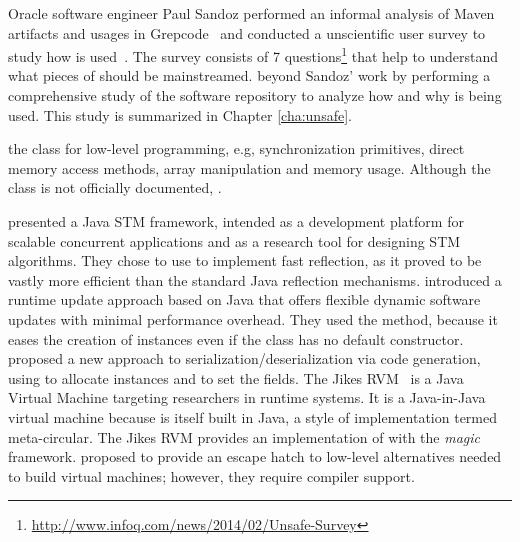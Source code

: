 Oracle software engineer Paul Sandoz performed an informal analysis of
Maven artifacts and usages in Grepcode~\citep{sandoz-personal-communication}
and conducted a unscientific user survey to study how \unsafe{} is used~\citep{psandoz14}.
The survey consists of 7 questions\footnote{\url{http://www.infoq.com/news/2014/02/Unsafe-Survey}} 
that help to understand what pieces of \smu{} should be mainstreamed.
beyond Sandoz' work
by performing a comprehensive study of the \mavencentral{} software repository to analyze how and why \smu{} is being used.
This study is summarized in Chapter \ref{cha:unsafe}.

 the \smu{} class for low-level programming, e.g, synchronization primitives, direct memory access methods, array manipulation and memory usage.
Although the \smu{} class is not officially documented,
.

\cite{korlandNoninvasiveConcurrencyJava2010} presented a Java STM framework, intended as a development platform for scalable concurrent applications and as a research tool for designing STM algorithms.
They chose to use \smu{} to implement fast reflection, as it proved to be vastly more efficient than the standard Java reflection mechanisms.
\cite{pukallFlexibleDynamicSoftware} introduced a runtime update approach based on Java that offers flexible dynamic software updates with minimal performance overhead.
They used the  method, because it eases the creation of instances even if the class has no default constructor.
\cite{gligoricCoDeSeFastDeserialization2011} proposed a new approach to serialization/deserialization via code generation, using \smu{} to allocate instances and to set the fields.
The Jikes RVM~\cite{alpernJikesResearchVirtual2005} is a Java Virtual Machine targeting researchers in runtime systems.
It is a Java-in-Java virtual machine because is itself built in Java, a style of implementation termed meta-circular.
The Jikes RVM provides an implementation of \smu{} with the \emph{magic} framework.
\cite{framptonDemystifyingMagicHighlevel2009} proposed  to provide an escape hatch to low-level alternatives needed to build virtual machines; however, they require compiler support.

